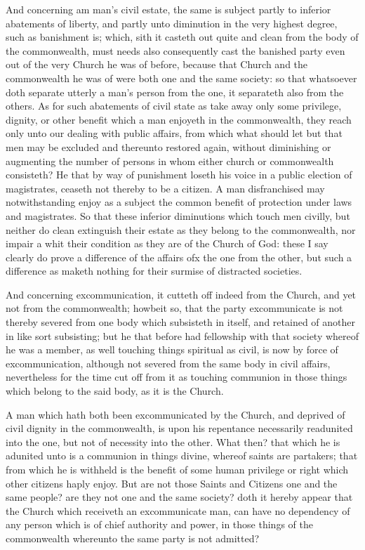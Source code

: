 And concerning am man’s civil estate, the same is subject partly to inferior abatements of liberty, and partly unto diminution in the very highest degree, such as banishment is; which, sith it casteth out quite and clean from the body of the commonwealth, must needs also consequently cast the banished party even out of the very Church he was of before, because that Church and the commonwealth he was of were  both one and the same society: so that whatsoever doth separate utterly a man’s person from the one, it separateth also from the others. As for such abatements of civil state as take away only some privilege, dignity, or other benefit which a man enjoyeth in the commonwealth, they reach only unto our dealing with public affairs, from which what should let but that men may be excluded and thereunto restored again, without diminishing or augmenting the number of persons in whom either church or commonwealth consisteth? He that by way of punishment loseth his voice in a public election of magistrates, ceaseth not thereby to be a citizen. A man disfranchised may notwithstanding enjoy as a subject the common benefit of protection under laws and magistrates. So that these inferior diminutions which touch men civilly, but neither do clean extinguish their estate as they belong to the commonwealth, nor impair a whit their condition as they are of the Church of God: these I say clearly do prove a difference of the affairs ofx the one from the other, but such a difference as maketh nothing for their surmise of distracted societies.

And concerning excommunication, it cutteth off indeed from the Church, and yet not from the commonwealth; howbeit so, that the party excommunicate is not thereby severed from one body which subsisteth in itself, and retained of another in like sort subsisting; but he that before had fellowship with that society whereof he was a member, as well touching things spiritual as civil, is now by force of excommunication, although not severed from the same body in civil affairs, nevertheless for the time cut off from it as touching communion in those things which belong to the said body, as it is the Church.

A man which hath both been excommunicated by the Church, and deprived of civil dignity in the commonwealth, is upon his repentance necessarily readunited into the one, but not of necessity into the other. What then? that which he is adunited unto is a communion in things divine, whereof saints are partakers; that from which he is withheld  is the benefit of some human privilege or right which other citizens haply enjoy. But are not those Saints and Citizens one and the same people? are they not one and the same society? doth it hereby appear that the Church which receiveth an excommunicate man, can have no dependency of any person which is of chief authority and power, in those things of the commonwealth whereunto the same party is not admitted?

